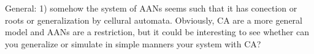 \documentclass[11pt]{article}
\newcommand{\ilanswer}[1]{\textcolor{blue}{#1}}
\begin{document}
General: 1) somehow the system of AANs seems such that it has conection or roots or generalization by cellural automata. Obviously, CA are a more general model and AANs are a restriction, but it could be interesting to see whether can you generalize or simulate in simple manners your system with CA?

% 
% 
% 
\end{document}
